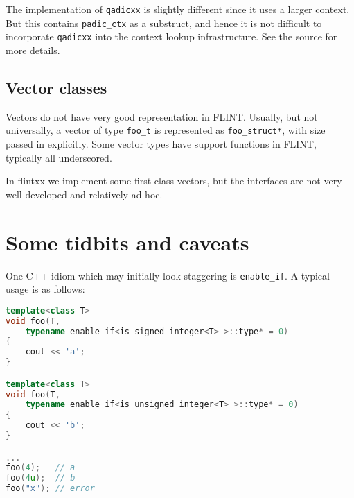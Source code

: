 \documentclass[a4paper,10pt]{book}
\newcommand{\code}{\lstinline}
\begin{document}
{{The implementation of \code{qadicxx} is slightly different since it uses a
larger context. But this contains \code{padic_ctx} as a substruct, and hence it
is not difficult to incorporate \code{qadicxx} into the context lookup
infrastructure. See the source for more details.

\subsection{Vector classes}

Vectors do not have very good representation in FLINT. Usually, but not
universally, a vector of type
\code{foo_t} is represented as \code{foo_struct*}, with size passed in
explicitly. Some vector types have support functions in FLINT, typically all
underscored.

In flintxx we implement some first class vectors, but the interfaces are not
very well developed and relatively ad-hoc.

\section{Some tidbits and caveats}

One C++ idiom which may initially look staggering is \code{enable_if}. A typical
usage is as follows:

\begin{lstlisting}[language=c++]
template<class T>
void foo(T,
    typename enable_if<is_signed_integer<T> >::type* = 0)
{
    cout << 'a';
}

template<class T>
void foo(T,
    typename enable_if<is_unsigned_integer<T> >::type* = 0)
{
    cout << 'b';
}

...
foo(4);   // a
foo(4u);  // b
foo("x"); // error
\end{lstlisting}

}}
\end{document}
